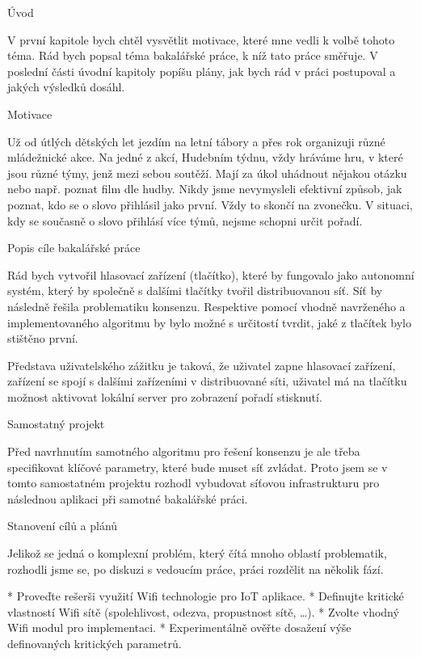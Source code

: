 
\def\ctustyle{{\ssr CTUstyle}}
\def\ttb{\tt\char`\\} %

\chap Úvod

V první kapitole bych chtěl vysvětlit motivace, které mne vedli k volbě tohoto téma. Rád bych popsal téma bakalářské práce, k níž tato práce směřuje. V poslední části úvodní kapitoly popíšu plány, jak bych rád v práci postupoval a jakých výsledků dosáhl.

\sec Motivace

Už od útlých dětských let jezdím na letní tábory a přes rok organizuji různé mládežnické akce. Na jedné z akcí, Hudebním týdnu, vždy hráváme hru, v které jsou různé týmy, jenž mezi sebou soutěží. Mají za úkol uhádnout nějakou otázku nebo např. poznat film dle hudby. Nikdy jsme nevymysleli efektivní způsob, jak poznat, kdo se o slovo přihlásil jako první. Vždy to skončí na zvonečku. V situaci, kdy se současně o slovo přihlásí více týmů, nejsme schopni určit pořadí. 

\sec Popis cíle bakalářské práce

Rád bych vytvořil hlasovací zařízení (tlačítko), které by fungovalo jako autonomní systém, který by společně s dalšími tlačítky tvořil distribuovanou síť. Síť by následně řešila problematiku konsenzu. Respektive pomocí vhodně navrženého a implementovaného algoritmu by bylo možné s určitostí tvrdit, jaké z tlačítek bylo stištěno první. 

Představa uživatelského zážitku je taková, že uživatel zapne hlasovací zařízení, zařízení se spojí s dalšími zařízeními v distribuované síti, uživatel má na tlačítku možnost aktivovat lokální server pro zobrazení pořadí stisknutí. 

\sec Samostatný projekt

Před navrhnutím samotného algoritmu pro řešení konsenzu je ale třeba specifikovat klíčové parametry, které bude muset síť zvládat. Proto jsem se v tomto samostatném projektu rozhodl vybudovat síťovou infrastrukturu pro následnou aplikaci při samotné bakalářské práci. 


\sec Stanovení cílů a plánů

Jelikož se jedná o komplexní problém, který čítá mnoho oblastí problematik, rozhodli jsme se, po diskuzi s vedoucím práce, práci rozdělit na několik fází.


\begitems
* Proveďte rešerši využití Wifi technologie pro IoT aplikace.
* Definujte kritické vlastností Wifi sítě (spolehlivost, odezva, propustnost sítě, …).
* Zvolte vhodný Wifi modul pro implementaci.
* Experimentálně ověřte dosažení výše definovaných kritických parametrů.
\enditems
